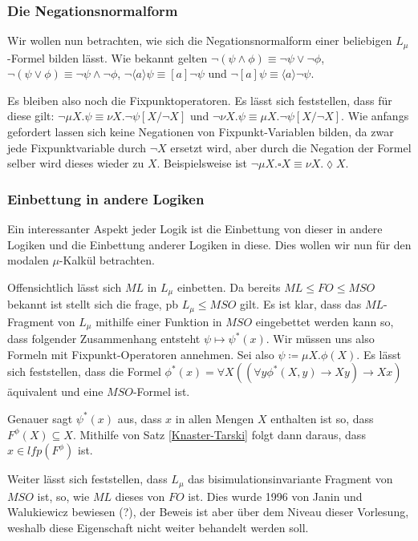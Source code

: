 \subsubsection*{Die Negationsnormalform}

Wir wollen nun betrachten, wie sich die Negationsnormalform einer beliebigen $L_\mu$-Formel bilden lässt. Wie bekannt gelten $\neg(\psi\land\phi)\equiv \neg\psi \lor \neg\phi$, $\neg(\psi\lor\phi) \equiv \neg\psi\land\neg\phi$, $\neg\langle a \rangle\psi \equiv [a]\neg\psi$ und $\neg[a]\psi \equiv \langle a \rangle \neg\psi$.

Es bleiben also noch die Fixpunktoperatoren. Es lässt sich feststellen, dass für diese gilt: $\neg\mu X .\psi \equiv \nu X . \neg\psi[X/\neg X]$ und $\neg\nu X.\psi \equiv \mu X.\neg\psi[X/\neg X]$. Wie anfangs gefordert lassen sich keine Negationen von Fixpunkt-Variablen bilden, da zwar jede Fixpunktvariable durch $\neg X$ ersetzt wird, aber durch die Negation der Formel selber wird dieses wieder zu $X$. Beispielsweise ist $\neg\mu X .\square X \equiv \nu X . \lozenge X$.

\subsubsection*{Einbettung in andere Logiken}

Ein interessanter Aspekt jeder Logik ist die Einbettung von dieser in andere Logiken und die Einbettung anderer Logiken in diese. Dies wollen wir nun für den modalen $\mu$-Kalkül betrachten.

Offensichtlich lässt sich $ML$ in $L_\mu$ einbetten. Da bereits $ML \leq FO \leq MSO$ bekannt ist stellt sich die frage, pb $L_\mu\leq MSO$ gilt. Es ist klar, dass das $ML$-Fragment von $L_\mu$ mithilfe einer Funktion in $MSO$ eingebettet werden kann so, dass folgender Zusammenhang entsteht $\psi \mapsto \psi^\ast(x)$. Wir müssen uns also Formeln mit Fixpunkt-Operatoren annehmen. Sei also $\psi\coloneqq \mu X . \phi(X)$. Es lässt sich feststellen, dass die Formel $\phi^\ast(x)=\forall X ((\forall y \phi^\ast(X,y)\rightarrow Xy) \rightarrow Xx)$ äquivalent und eine $MSO$-Formel ist.

Genauer sagt $\psi^\ast(x)$ aus, dass $x$ in allen Mengen $X$ enthalten ist so, dass $F^\phi(X)\subseteq X$. Mithilfe von Satz \ref{Knaster-Tarski} folgt dann daraus, dass $x\in lfp(F^\phi)$ ist.

Weiter lässt sich feststellen, dass $L_\mu$ das bisimulationsinvariante Fragment von $MSO$ ist, so, wie $ML$ dieses von $FO$ ist. Dies wurde 1996 von Janin und Walukiewicz bewiesen (?), der Beweis ist aber über dem Niveau dieser Vorlesung, weshalb diese Eigenschaft nicht weiter behandelt werden soll.

